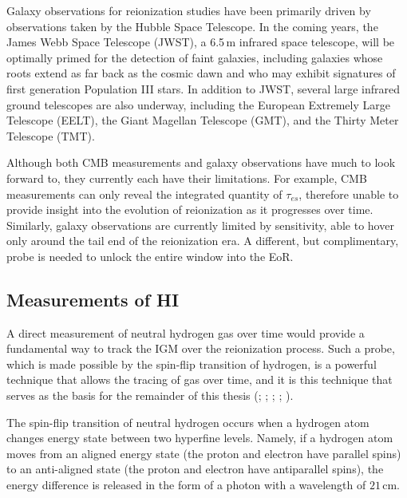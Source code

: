 Galaxy observations for reionization studies have been primarily driven by observations taken by the Hubble Space Telescope. In the coming years, the James Webb Space Telescope (JWST), a 6.5\,m infrared space telescope, will be optimally primed for the detection of faint galaxies, including galaxies whose roots extend as far back as the cosmic dawn and who may exhibit signatures of first generation Population III stars. In addition to JWST, several large infrared ground telescopes are also underway, including the European Extremely Large Telescope (EELT), the Giant Magellan Telescope (GMT), and the Thirty Meter Telescope (TMT). 

Although both CMB measurements and galaxy observations have much to look forward to, they currently each have their limitations. For example, CMB measurements can only reveal the integrated quantity of $\tau_{es}$, therefore unable to provide insight into the evolution of reionization as it progresses over time. Similarly, galaxy observations are currently limited by sensitivity, able to hover only around the tail end of the reionization era. A different, but complimentary, probe is needed to unlock the entire window into the EoR.

\subsection{Measurements of HI}

A direct measurement of neutral hydrogen gas over time would provide a fundamental way to track the IGM over the reionization process. Such a probe, which is made possible by the spin-flip transition of hydrogen, is a powerful technique that allows the tracing of gas over time, and it is this technique that serves as the basis for the remainder of this thesis (\citealt{furlanetto_et_al2006}; \citealt{barkana_and_loeb2008}; \citealt{morales_and_wyithe2010}; \citealt{pritchard_and_loeb2010}; \citealt{pritchard_loeb2012}). 

The spin-flip transition of neutral hydrogen occurs when a hydrogen atom changes energy state between two hyperfine levels. Namely, if a hydrogen atom moves from an aligned energy state (the proton and electron have parallel spins) to an anti-aligned state (the proton and electron have antiparallel spins), the energy difference is released in the form of a photon with a wavelength of $21$\,cm. 


